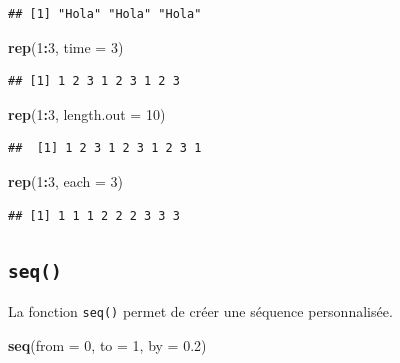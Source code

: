 \documentclass[]{book}
\newenvironment{Shaded}{\begin{snugshade}}{\end{snugshade}}
\newcommand{\DataTypeTok}[1]{\textcolor[rgb]{0.13,0.29,0.53}{#1}}
\newcommand{\DecValTok}[1]{\textcolor[rgb]{0.00,0.00,0.81}{#1}}
\newcommand{\FloatTok}[1]{\textcolor[rgb]{0.00,0.00,0.81}{#1}}
\newcommand{\KeywordTok}[1]{\textcolor[rgb]{0.13,0.29,0.53}{\textbf{#1}}}
\newcommand{\NormalTok}[1]{#1}
\newcommand{\OperatorTok}[1]{\textcolor[rgb]{0.81,0.36,0.00}{\textbf{#1}}}
\begin{document}
\begin{verbatim}
## [1] "Hola" "Hola" "Hola"
\end{verbatim}

\begin{Shaded}
\begin{Highlighting}[]
\KeywordTok{rep}\NormalTok{(}\DecValTok{1}\OperatorTok{:}\DecValTok{3}\NormalTok{, }\DataTypeTok{time =} \DecValTok{3}\NormalTok{)}
\end{Highlighting}
\end{Shaded}

\begin{verbatim}
## [1] 1 2 3 1 2 3 1 2 3
\end{verbatim}

\begin{Shaded}
\begin{Highlighting}[]
\KeywordTok{rep}\NormalTok{(}\DecValTok{1}\OperatorTok{:}\DecValTok{3}\NormalTok{, }\DataTypeTok{length.out =} \DecValTok{10}\NormalTok{)}
\end{Highlighting}
\end{Shaded}

\begin{verbatim}
##  [1] 1 2 3 1 2 3 1 2 3 1
\end{verbatim}

\begin{Shaded}
\begin{Highlighting}[]
\KeywordTok{rep}\NormalTok{(}\DecValTok{1}\OperatorTok{:}\DecValTok{3}\NormalTok{, }\DataTypeTok{each =} \DecValTok{3}\NormalTok{)}
\end{Highlighting}
\end{Shaded}

\begin{verbatim}
## [1] 1 1 1 2 2 2 3 3 3
\end{verbatim}

\hypertarget{l015seq}{%
\subsection{\texorpdfstring{\texttt{seq()}}{seq()}}\label{l015seq}}

La fonction \texttt{seq()} permet de créer une séquence personnalisée.

\begin{Shaded}
\begin{Highlighting}[]
\KeywordTok{seq}\NormalTok{(}\DataTypeTok{from =} \DecValTok{0}\NormalTok{, }\DataTypeTok{to =} \DecValTok{1}\NormalTok{, }\DataTypeTok{by =} \FloatTok{0.2}\NormalTok{)}
\end{Highlighting}
\end{Shaded}
\end{document}

